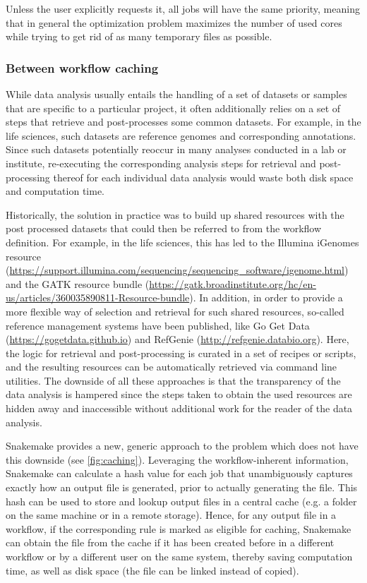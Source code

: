 \documentclass[parskip=half]{scrartcl}
\let\plainurl\url
\renewcommand{\url}[1]{\protect\plainurl{#1}}
\begin{document}
Unless the user explicitly requests it, all jobs will have the same priority, meaning that in general the optimization problem maximizes the number of used cores while trying to get rid of as many temporary files as possible.

\subsubsection{Between workflow caching}

While data analysis usually entails the handling of a set of datasets or samples that are specific to a particular project, it often additionally relies on a set of steps that retrieve and post-processes some common datasets.
For example, in the life sciences, such datasets are reference genomes and corresponding annotations.
Since such datasets potentially reoccur in many analyses conducted in a lab or institute, re-executing the corresponding analysis steps for retrieval and post-processing thereof for each individual data analysis would waste both disk space and computation time.

Historically, the solution in practice was to build up shared resources with the post processed datasets that could then be referred to from the workflow definition.
For example, in the life sciences, this has led to the Illumina iGenomes resource (\url{https://support.illumina.com/sequencing/sequencing\_software/igenome.html}) and the GATK resource bundle (\url{https://gatk.broadinstitute.org/hc/en-us/articles/360035890811-Resource-bundle}).
In addition, in order to provide a more flexible way of selection and retrieval for such shared resources, so-called reference management systems have been published, like Go Get Data (\url{https://gogetdata.github.io}) and RefGenie (\url{http://refgenie.databio.org}).
Here, the logic for retrieval and post-processing is curated in a set of recipes or scripts, and the resulting resources can be automatically retrieved via command line utilities.
The downside of all these approaches is that the transparency of the data analysis is hampered since the steps taken to obtain the used resources are hidden away and inaccessible without additional work for the reader of the data analysis.

Snakemake provides a new, generic approach to the problem which does not have this downside (see \autoref{fig:caching}).
Leveraging the workflow-inherent information, Snakemake can calculate a hash value for each job that unambiguously captures exactly how an output file is generated, prior to actually generating the file.
This hash can be used to store and lookup output files in a central cache (e.g. a folder on the same machine or in a remote storage).
Hence, for any output file in a workflow, if the corresponding rule is marked as eligible for caching, Snakemake can obtain the file from the cache if it has been created before in a different workflow or by a different user on the same system, thereby saving computation time, as well as disk space (the file can be linked instead of copied).
\end{document}
